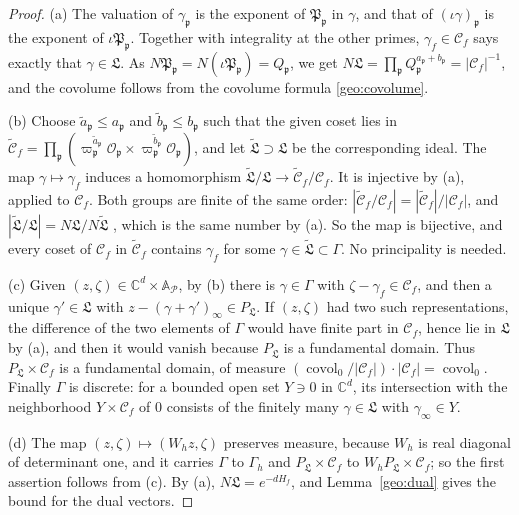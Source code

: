 \documentclass[11pt]{amsart}
\numberwithin{equation}{section}
\theoremstyle{definition}
\theoremstyle{remark}
\DeclareMathOperator{\covol}{covol}
\newcommand{\C}{\mathbb C}
\begin{document}
\begin{proof}
(a) The valuation of $\gamma_{\mathfrak p}$ is the exponent of
$\mathfrak P_{\mathfrak p}$ in $\gamma$, and that of $(\iota\gamma)_{\mathfrak
p}$ is the exponent of $\iota\mathfrak P_{\mathfrak p}$. Together with
integrality at the other primes, $\gamma_f\in\mathcal C_f$ says exactly
that $\gamma\in\mathfrak L$. As $N\mathfrak P_{\mathfrak
p}=N(\iota\mathfrak P_{\mathfrak p})=Q_{\mathfrak p}$, we get
$N\mathfrak L=\prod_{\mathfrak p}Q_{\mathfrak p}^{a_{\mathfrak
p}+b_{\mathfrak p}}=|\mathcal C_f|^{-1}$, and the covolume follows from
the covolume formula \eqref{geo:covolume}.

(b) Choose $\tilde a_{\mathfrak p}\le a_{\mathfrak p}$ and $\tilde
b_{\mathfrak p}\le b_{\mathfrak p}$ such that the given coset lies in
$\tilde{\mathcal C}_f=\prod_{\mathfrak p}(\varpi_{\mathfrak p}^{\tilde
a_{\mathfrak p}}\mathcal O_{\mathfrak p}\times\varpi_{\mathfrak
p}^{\tilde b_{\mathfrak p}}\mathcal O_{\mathfrak p})$, and let
$\tilde{\mathfrak L}\supset\mathfrak L$ be the corresponding ideal. The
map $\gamma\mapsto\gamma_f$ induces a homomorphism $\tilde{\mathfrak
L}/\mathfrak L\to\tilde{\mathcal C}_f/\mathcal C_f$. It is injective by
(a), applied to $\mathcal C_f$. Both groups are finite of the same
order: $|\tilde{\mathcal C}_f/\mathcal C_f|=|\tilde{\mathcal
C}_f|/|\mathcal C_f|$, and $|\tilde{\mathfrak L}/\mathfrak L|=N\mathfrak
L/N\tilde{\mathfrak L}$ \cite[Proposition~4.2]{MilneANT}, which is the
same number by (a). So the map is bijective, and every coset of
$\mathcal C_f$ in $\tilde{\mathcal C}_f$ contains $\gamma_f$ for some
$\gamma\in\tilde{\mathfrak L}\subset\Gamma$. No principality is needed.

(c) Given $(z,\zeta)\in\C^d\times\mathbb A_{\mathcal P}$, by (b) there is
$\gamma\in\Gamma$ with $\zeta-\gamma_f\in\mathcal C_f$, and then a unique
$\gamma'\in\mathfrak L$ with $z-(\gamma+\gamma')_\infty\in P_{\mathfrak
L}$. If $(z,\zeta)$ had two such representations, the difference of the
two elements of $\Gamma$ would have finite part in $\mathcal C_f$, hence
lie in $\mathfrak L$ by (a), and then it would vanish because
$P_{\mathfrak L}$ is a fundamental domain. Thus
$P_{\mathfrak L}\times\mathcal C_f$ is a fundamental domain, of measure
$(\covol_0/|\mathcal C_f|)\cdot|\mathcal C_f|=\covol_0$. Finally $\Gamma$
is discrete: for a bounded open set $Y\ni0$ in $\C^d$, its intersection
with the neighborhood $Y\times\mathcal C_f$ of $0$ consists of the
finitely many $\gamma\in\mathfrak L$ with $\gamma_\infty\in Y$.

(d) The map $(z,\zeta)\mapsto(W_hz,\zeta)$ preserves measure, because
$W_h$ is real diagonal of determinant one, and it carries $\Gamma$ to
$\Gamma_h$ and $P_{\mathfrak L}\times\mathcal C_f$ to $W_hP_{\mathfrak
L}\times\mathcal C_f$; so the first assertion follows from (c). By (a),
$N\mathfrak L=e^{-dH_f}$, and Lemma~\ref{geo:dual} gives the bound for
the dual vectors.
\end{proof}
\end{document}
